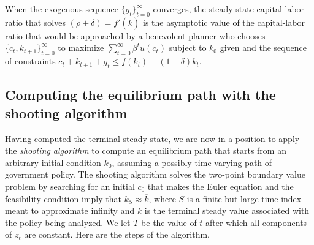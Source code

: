 When the exogenous sequence  $\{g_t\}_{t=0}^\infty$  converges, the steady state capital-labor ratio that solves $(\rho+\delta)=f'(\overline k)$ is  the
asymptotic value of the capital-labor  ratio that would be approached by
a benevolent planner who chooses $\{c_t, k_{t+1}\}_{t=0}^\infty$ to maximize $\sum_{t=0}^\infty \beta^t u(c_t) $
subject to $k_0$ given and the sequence of constraints $c_t + k_{t+1} + g_t \leq f(k_t) + (1-\delta) k_t$.

\subsection{Computing the equilibrium path with the shooting algorithm}

Having computed the terminal steady state, we are now in a
position to apply the {\it shooting algorithm\/} to compute an
equilibrium path that starts from an arbitrary initial condition
$k_0$, assuming a possibly time-varying path of government policy.%
%
%
%
%
%
%
%
%
%
The shooting algorithm solves the two-point
boundary value problem by  searching for an initial $c_0$ that
makes the Euler equation  and the feasibility condition
 imply that $k_S \approx \overline k$, where $S$ is a
finite but large time index meant to approximate infinity and
$\overline k$ is the terminal steady value associated with the
policy being analyzed. We let $T$ be the value of $t$ after which
all components of $z_t$ are constant.
 Here are the steps of the algorithm.
%

